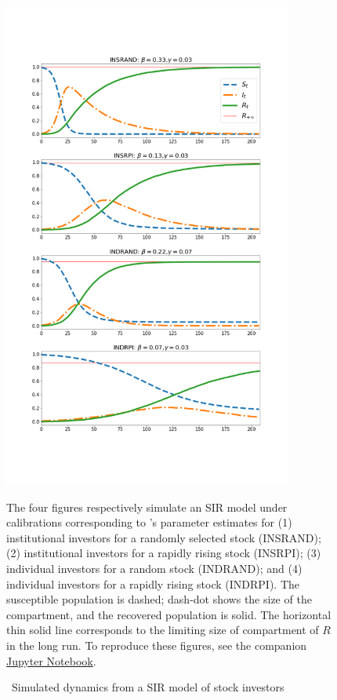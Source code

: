     \begin{figure} \centering  %
        \caption{ ~Simulated dynamics from a SIR model of stock investors}
        \label{fig:sir_simulate}
        \centerline{\includegraphics[width=0.85\textwidth,height=0.85\textheight]{./figures/sir_simulate}}
        \begin{flushleft}
            {\footnotesize The four figures respectively simulate an SIR model under calibrations corresponding to \cite{shiller1989survey}'s parameter estimates for (1) institutional investors for a randomly selected stock (INSRAND); (2) institutional investors for a rapidly rising stock (INSRPI); (3) individual investors for a random stock (INDRAND); and (4) individual investors for a rapidly rising stock (INDRPI). The susceptible population {\Susceptible} is dashed; dash-dot shows the size of the {\Infected} compartment, and the recovered population {\Recovered} is solid.  The horizontal thin solid line corresponds to the limiting size of compartment of $R$ in the long run.  To reproduce these figures, see the companion \href{https://github.com/llorracc/EpiExp/blob/master/SIR_Ndlib.ipynb}{Jupyter Notebook}. }
        \end{flushleft}
    \end{figure}
